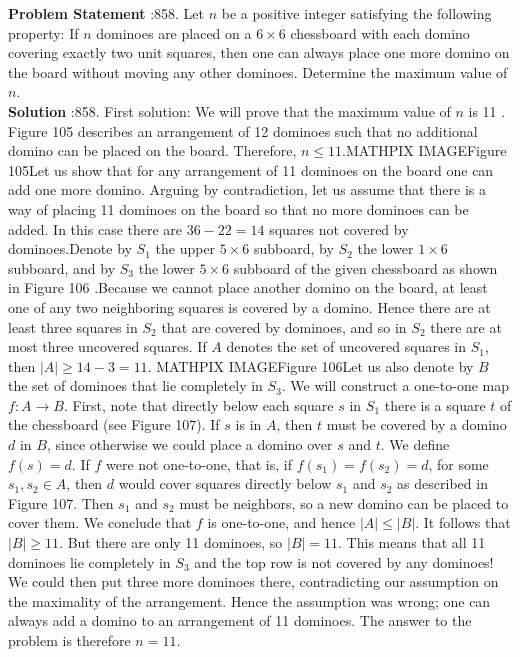 \documentclass[10pt]{article}
\begin{document}
\textbf{Problem Statement} :858. Let $n$ be a positive integer satisfying the following property: If $n$ dominoes are placed on a $6 \times 6$ chessboard with each domino covering exactly two unit squares, then one can always place one more domino on the board without moving any other dominoes. Determine the maximum value of $n$.\\
\textbf{Solution} :858. First solution: We will prove that the maximum value of $n$ is 11 . Figure 105 describes an arrangement of 12 dominoes such that no additional domino can be placed on the board. Therefore, $n \leq 11$.MATHPIX IMAGEFigure 105Let us show that for any arrangement of 11 dominoes on the board one can add one more domino. Arguing by contradiction, let us assume that there is a way of placing 11 dominoes on the board so that no more dominoes can be added. In this case there are $36-22=14$ squares not covered by dominoes.Denote by $S_{1}$ the upper $5 \times 6$ subboard, by $S_{2}$ the lower $1 \times 6$ subboard, and by $S_{3}$ the lower $5 \times 6$ subboard of the given chessboard as shown in Figure 106 .Because we cannot place another domino on the board, at least one of any two neighboring squares is covered by a domino. Hence there are at least three squares in $S_{2}$ that are covered by dominoes, and so in $S_{2}$ there are at most three uncovered squares. If $A$ denotes the set of uncovered squares in $S_{1}$, then $|A| \geq 14-3=11$.
MATHPIX IMAGEFigure 106Let us also denote by $B$ the set of dominoes that lie completely in $S_{3}$. We will construct a one-to-one map $f: A \rightarrow B$. First, note that directly below each square $s$ in $S_{1}$ there is a square $t$ of the chessboard (see Figure 107). If $s$ is in $A$, then $t$ must be covered by a domino $d$ in $B$, since otherwise we could place a domino over $s$ and $t$. We define $f(s)=d$. If $f$ were not one-to-one, that is, if $f\left(s_{1}\right)=f\left(s_{2}\right)=d$, for some $s_{1}, s_{2} \in A$, then $d$ would cover squares directly below $s_{1}$ and $s_{2}$ as described in Figure 107. Then $s_{1}$ and $s_{2}$ must be neighbors, so a new domino can be placed to cover them. We conclude that $f$ is one-to-one, and hence $|A| \leq|B|$. It follows that $|B| \geq 11$. But there are only 11 dominoes, so $|B|=11$. This means that all 11 dominoes lie completely in $S_{3}$ and the top row is not covered by any dominoes! We could then put three more dominoes there, contradicting our assumption on the maximality of the arrangement. Hence the assumption was wrong; one can always add a domino to an arrangement of 11 dominoes. The answer to the problem is therefore $n=11$.
\end{document}
